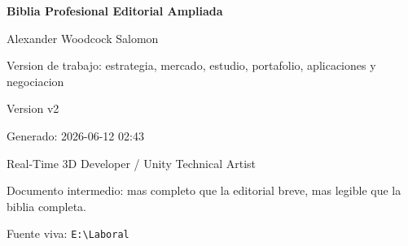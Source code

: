 \documentclass[10pt,openany]{book}
\begin{document}
\pagecolor{SoftAccent}
\thispagestyle{empty}
\begin{center}
\centering
\vspace*{1.8cm}
{\Huge\bfseries\textcolor{Accent}{Biblia Profesional Editorial Ampliada}\par}
\vspace{0.35cm}
{\LARGE Alexander Woodcock Salomon\par}
\vspace{1cm}
{\Large Version de trabajo: estrategia, mercado, estudio, portafolio, aplicaciones y negociacion\par}
\vspace{1.2cm}
{\large Version v2\par}
{\large Generado: 2026-06-12 02:43\par}
\vfill
{\large Real-Time 3D Developer / Unity Technical Artist\par}
{\small Documento intermedio: mas completo que la editorial breve, mas legible que la biblia completa.\par}
\vspace{0.8cm}
{\small Fuente viva: \texttt{E:\textbackslash{}Laboral}\par}
\end{center}
\clearpage
\nopagecolor

\tableofcontents
\clearpage




















\end{document}
